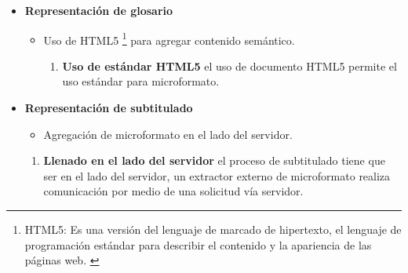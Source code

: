 \begin{itemize}

\item \textbf{Representación de glosario}

\begin{itemize}

\item Uso de HTML5 \footnote{HTML5: Es una versión del lenguaje de marcado
de hipertexto, el lenguaje de programación estándar para describir el
contenido y la apariencia de las páginas web. \cite{html5}}  para agregar 
contenido semántico.

\begin{enumerate}

\item \textbf{Uso de estándar HTML5} el uso de documento HTML5 permite el
uso estándar para microformato.

\end{enumerate}

\end{itemize}

\item \textbf{Representación de subtitulado}

\begin{itemize}

\item Agregación de microformato en el lado del servidor.

\end{itemize}

\begin{enumerate}
 
\item \textbf{Llenado en el lado del servidor} el proceso de subtitulado
tiene que ser en el lado del servidor, un extractor externo de microformato
realiza comunicación por medio de una solicitud vía servidor.


\end{enumerate}
\end{itemize}
